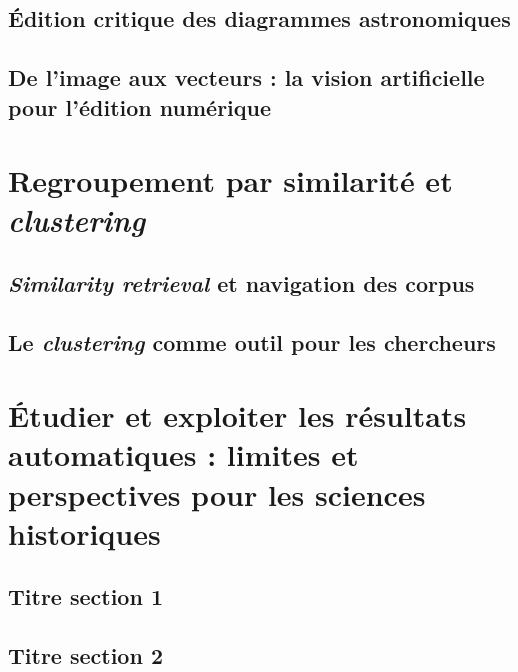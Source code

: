 \documentclass[a4paper,12pt,twoside]{book}
\newcommand{\clearemptydoublepage}{\newpage{\pagestyle{empty}\cleardoublepage}}
\begin{document}
                \section{Édition critique des diagrammes astronomiques}
                    
            
                \section[De l’image aux vecteurs]{De l’image aux vecteurs : la vision artificielle pour l’édition numérique}
                    
            
        \clearemptydoublepage
        
        \chapter{Regroupement par similarité et \textit{clustering}}
                \section{\textit{Similarity retrieval} et navigation des corpus}
                    
            
                \section{Le \textit{clustering} comme outil pour les chercheurs}
                    
            
        \clearemptydoublepage
        
        \chapter[Exploiter les résultats automatique]{Étudier et exploiter les résultats automatiques : limites et perspectives pour les sciences historiques}
                \section{Titre section 1}
                    
            
                \section{Titre section 2}
                    
            
\end{document}
